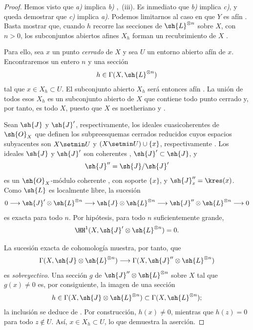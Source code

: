 \documentclass[oneside]{amsart}
\newcommand{\oldpage}[2][]{{\marginnote{\normalfont\textbf{#1}~|~#2}}\ignorespaces}
\begin{document}
\begin{proof}
Hemos visto que \emph{a)} implica \emph{b)} ,~(iii).
Es inmediato que \emph{b)} implica \emph{c)}, y queda demostrar
que \emph{c)} implica \emph{a)}.
Podemos limitarnos al caso en que $Y$ es afín .
Basta mostrar que, cuando $h$ recorre las secciones de
$\sh{L}^{\otimes n}$ sobre $X$, con $n>0$, los subconjuntos abiertos afines $X_h$
forman un recubrimiento de $X$ .

Para ello, sea $x$ un punto \emph{cerrado} de $X$ y sea $U$ un entorno
abierto afín de $x$.
Encontraremos un entero $n$ y una sección
\[
  h\in\Gamma(X,\sh{L}^{\otimes n})
\]
tal que $x\in X_h\subset U$.
El subconjunto abierto $X_h$ será entonces afín .
La unión de todos esos $X_h$ es un subconjunto abierto de $X$ que contiene todo
punto cerrado y, por tanto, es todo $X$, puesto que $X$ es noetheriano
 y .

Sean $\sh{J}$ y $\sh{J}'$, respectivamente, los ideales cuasicoherentes de
$\sh{O}_X$ que definen los subpreesquemas cerrados reducidos cuyos espacios
subyacentes son $X\setmin U$ y $(X\setmin U)\cup\{x\}$, respectivamente .
Los ideales $\sh{J}$ y $\sh{J}'$ son coherentes ,
$\sh{J}'\subset\sh{J}$, y
\[
  \sh{J}''=\sh{J}/\sh{J}'
\]
es un $\sh{O}_X$-módulo coherente , con soporte
$\{x\}$, y $\sh{J}''_x=\kres(x)$.
Como $\sh{L}$ es localmente libre, la sucesión
\[
  0\longrightarrow
  \sh{J}'\otimes\sh{L}^{\otimes n}
  \longrightarrow
  \sh{J}\otimes\sh{L}^{\otimes n}
  \longrightarrow
  \sh{J}''\otimes\sh{L}^{\otimes n}
  \longrightarrow0
\]
es exacta para todo $n$.
Por hipótesis, para todo $n$ suficientemente grande,
\[
  \HH^1(X,\sh{J}'\otimes\sh{L}^{\otimes n})=0.
\]

\oldpage[III]{112}

La sucesión exacta de cohomología muestra, por tanto, que
\[
  \Gamma(X,\sh{J}\otimes\sh{L}^{\otimes n})
  \longrightarrow
  \Gamma(X,\sh{J}''\otimes\sh{L}^{\otimes n})
\]
es \emph{sobreyectivo}.
Una sección $g$ de $\sh{J}''\otimes\sh{L}^{\otimes n}$ sobre $X$ tal que
$g(x)\neq0$ es, por consiguiente, la imagen de una sección
\[
  h\in\Gamma(X,\sh{J}\otimes\sh{L}^{\otimes n})
  \subset\Gamma(X,\sh{L}^{\otimes n});
\]
la inclusión se deduce de .
Por construcción, $h(x)\neq0$, mientras que $h(z)=0$ para todo $z\notin U$.
Así, $x\in X_h\subset U$, lo que demuestra la aserción.
\end{proof}
\end{document}

